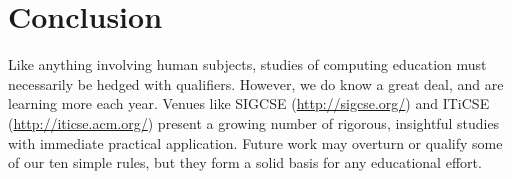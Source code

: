 \documentclass{article}
\begin{document}
\section*{Conclusion}

Like anything involving human subjects,
studies of computing education must necessarily be hedged with qualifiers.
However,
we do know a great deal,
and are learning more each year.
Venues like SIGCSE (\url{http://sigcse.org/}) and ITiCSE (\url{http://iticse.acm.org/})
present a growing number of rigorous, insightful studies
with immediate practical application.
Future work may overturn or qualify some of our ten simple rules,
but they form a solid basis for any educational effort.



\end{document}
